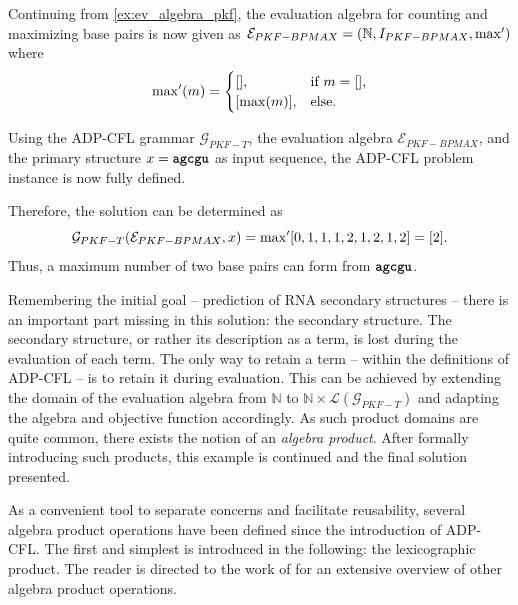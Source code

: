 \documentclass[
    a4paper,
    12pt,
    twoside,
    BCOR=12mm,
    parskip=half,
    chapterprefix,
    numbers=noenddot,
    bibliography=totoc
]{scrbook}
\begin{document}
\begin{example}
\label{ex:adp_solution_pkf}
  Continuing from \cref{ex:ev_algebra_pkf}, the evaluation algebra for counting and maximizing base pairs is now given as $\mathcal{E}_{PKF-BPMAX} = (\mathbb{N}, I_{PKF-BPMAX}, \mathrm{max'})$ where 
	\begin{equation*}
		\mathrm{max}'(m)=\begin{cases}
		[],  & \text{if $m=[]$,}\\
		[\max(m)], & \text{else.}
		\end{cases}
	\end{equation*}
    
	Using the ADP-CFL grammar $\mathcal{G}_{PKF-T}$, the evaluation algebra $\mathcal{E}_{PKF-BPMAX}$, and the primary structure $x=\ts{agcgu}$ as input sequence, the ADP-CFL problem instance is now fully defined.
  
	Therefore, the solution can be determined as
	\[ \mathcal{G}_{PKF-T}(\mathcal{E}_{PKF-BPMAX},x) = \mathrm{max}' [0,1,1,1,2,1,2,1,2] = [2]. \]
	Thus, a maximum number of two base pairs can form from $\ts{agcgu}$.
	
	Remembering the initial goal -- prediction of \gls{RNA} secondary structures -- there is an important part missing in this solution: the secondary structure. The secondary structure, or rather its description as a term, is lost during the evaluation of each term. The only way to retain a term -- within the definitions of ADP-CFL -- is to retain it during evaluation. This can be achieved by extending the domain of the evaluation algebra from $\mathbb{N}$ to $\mathbb{N} \times \mathcal{L}(\mathcal{G}_{PKF-T})$ and adapting the algebra and objective function accordingly. As such product domains are quite common, there exists the notion of an \emph{algebra product}. After formally introducing such products, this example is continued and the final solution presented.
\end{example}

As a convenient tool to separate concerns and facilitate reusability, several algebra product operations have been defined since the introduction of ADP-CFL. The first and simplest is introduced in the following: the lexicographic product. The reader is directed to the work of \citet{sauthoff_bellmans_2011-1} for an extensive overview of other algebra product operations.
\end{document}
